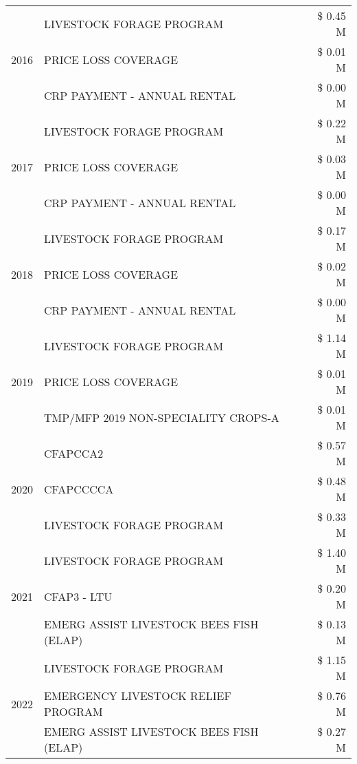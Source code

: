 \begin{tabular}{llr}
\cline{1-3}
\multirow[t]{3}{*}{2016} & LIVESTOCK FORAGE PROGRAM & \$ 0.45 M \\
 & PRICE LOSS COVERAGE & \$ 0.01 M \\
 & CRP PAYMENT - ANNUAL RENTAL & \$ 0.00 M \\
\cline{1-3}
\multirow[t]{3}{*}{2017} & LIVESTOCK FORAGE PROGRAM & \$ 0.22 M \\
 & PRICE LOSS COVERAGE & \$ 0.03 M \\
 & CRP PAYMENT - ANNUAL RENTAL & \$ 0.00 M \\
\cline{1-3}
\multirow[t]{3}{*}{2018} & LIVESTOCK FORAGE PROGRAM & \$ 0.17 M \\
 & PRICE LOSS COVERAGE & \$ 0.02 M \\
 & CRP PAYMENT - ANNUAL RENTAL & \$ 0.00 M \\
\cline{1-3}
\multirow[t]{3}{*}{2019} & LIVESTOCK FORAGE PROGRAM & \$ 1.14 M \\
 & PRICE LOSS COVERAGE & \$ 0.01 M \\
 & TMP/MFP 2019 NON-SPECIALITY CROPS-A & \$ 0.01 M \\
\cline{1-3}
\multirow[t]{3}{*}{2020} & CFAPCCA2 & \$ 0.57 M \\
 & CFAPCCCCA & \$ 0.48 M \\
 & LIVESTOCK FORAGE PROGRAM & \$ 0.33 M \\
\cline{1-3}
\multirow[t]{3}{*}{2021} & LIVESTOCK FORAGE PROGRAM & \$ 1.40 M \\
 & CFAP3 - LTU & \$ 0.20 M \\
 & EMERG ASSIST LIVESTOCK BEES FISH (ELAP) & \$ 0.13 M \\
\cline{1-3}
\multirow[t]{3}{*}{2022} & LIVESTOCK FORAGE PROGRAM & \$ 1.15 M \\
 & EMERGENCY LIVESTOCK RELIEF PROGRAM & \$ 0.76 M \\
 & EMERG ASSIST LIVESTOCK BEES FISH (ELAP) & \$ 0.27 M \\
\cline{1-3}
\bottomrule
\end{tabular}
